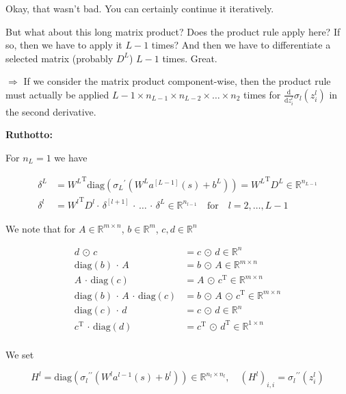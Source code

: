 Okay, that wasn't bad. You can certainly continue it iteratively. 

But what about this long matrix product? Does the product rule apply here? If so, then we have to apply it $L-1$ times? And then we have to differentiate a selected matrix (probably $D^{L}$) $L-1$ times. Great.

$\Rightarrow$ If we consider the matrix product component-wise, then the product rule must actually be applied $L-1 \times n_{L-1} \times n_{L-2} \times \ldots \times n_{2}$ times for $\frac{\mathrm{d}}{\mathrm{d} z^{l}_i} \sigma_{l}(z^{l}_i)$ in the second derivative.  

\textbf{Ruthotto:}

For $n_L = 1$ we have

\begin{align*}
    \delta^{L} & = {W^{L}}^{\mathrm{T}} \mathrm{diag}({\sigma_{L}}^{\prime}(W^{L} a^{[L-1]}(s) + b^{L})) = {W^{L}}^{\mathrm{T}} D^{L} \in \mathbb{R}^{n_{L-1}} \\
    \delta^{l} & = {W^{l}}^{\mathrm{T}} D^{l} \cdot \, \delta^{[l+1]} \, \cdot \, \ldots \,  \cdot \, \delta^{L} \in \mathbb{R}^{n_{l-1}} \quad \text{for} \quad l = 2, \ldots, L-1
\end{align*}

We note that for $A \in \mathbb{R}^{m \times n}$, $b \in \mathbb{R}^{m}$, $c, d \in \mathbb{R}^{n}$

\begin{align*}
    d \, \odot \, c &= c \, \odot \, d \in \mathbb{R}^{n} \\
    \mathrm{diag}(b) \, \cdot \, A &= b \, \odot \, A \in \mathbb{R}^{m \times n} \\
    A \, \cdot \, \mathrm{diag}(c) &= A \, \odot \, c^{\mathrm{T}} \in \mathbb{R}^{m \times n} \\
    \mathrm{diag}(b) \, \cdot \, A \, \cdot \, \mathrm{diag}(c) &= b \, \odot \, A \, \odot \, c^{\mathrm{T}} \in \mathbb{R}^{m \times n} \\
    \mathrm{diag}(c) \, \cdot \, d &= c \, \odot \, d \in \mathbb{R}^{n} \\
    c^{\mathrm{T}} \, \cdot \, \mathrm{diag}(d) &= c^{\mathrm{T}} \, \odot \, d^{\mathrm{T}} \in \mathbb{R}^{1 \times n} \\
\end{align*}

We set 

\begin{equation*}
    H^{l} = \mathrm{diag}({\sigma_{l}}^{\prime \prime}(W^{l} a^{l-1}(s) + b^{l})) \in \mathbb{R}^{n_l \times n_l}, \quad (H^{l})_{i, i} = {\sigma_{l}}^{\prime \prime} (z_{i}^{l})
\end{equation*}


